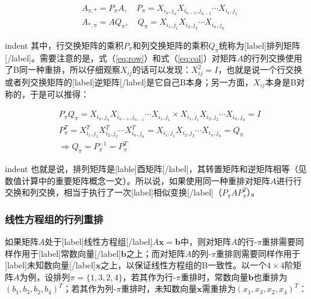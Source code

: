 \documentclass[UTF8,nofonts]{ctexart}
\begin{document}
\begin{eqnarray}
& A_{\pi,\ast} = P_\pi A,\quad P_\pi=X_{i_n,j_n}X_{i_{n-1},j_{n-1}}\cdots X_{i_1,j_1} \label{eq:row}\\
& A_{\ast,\pi} = AQ_\pi,\quad Q_\pi=X_{i_1,j_1}X_{i_2,j_2}\cdots X_{i_n,j_n} \label{eq:col}
\end{eqnarray}

indent 其中，行交换矩阵的乘积$P_\pi$和列交换矩阵的乘积$Q_\pi$统称为[label]排列矩阵[/label]。需要注意的是，式（\ref{eq:row}）和式（\ref{eq:col}）对矩阵$A$的行列交换使用了B同一种重排，所以仔细观察$X_{ij}$的话可以发现：$X^2_{ij}=I$，也就是说一个行交换或者列交换矩阵的[label]逆矩阵[/label]是它自己B本身；另一方面，$X_{ij}$本身是B对称的，于是可以推得：

\begin{eqnarray*}
& P_\pi Q_\pi = X_{i_n,j_n}X_{i_{n-1},j_{n-1}}\cdots X_{i_1,j_1} \times X_{i_1,j_1}X_{i_2,j_2}\cdots X_{i_n,j_n}=I \\
& P^T_{\pi}=X^T_{i_1,j_1}X^T_{i_2,j_2}\cdots X^T_{i_n,j_n}=X_{i_1,j_1}X_{i_2,j_2}\cdots X_{i_n,j_n}=Q_\pi \\
& \Longrightarrow Q_\pi=P^{-1}_\pi=P^T_\pi
\end{eqnarray*}

indent 也就是说，排列矩阵是[lable]酉矩阵[/label]，其转置矩阵和逆矩阵相等（见数值计算中的重要矩阵概念一文）。所以说，如果使用同一种重排对矩阵$A$进行行交换和列交换，相当于执行了一次[label]相似变换[/label]（$P_\pi AP_\pi^T$）。

\subsubsection*{线性方程组的行列重排}

如果矩阵$A$处于[label]线性方程组[/label]$A\boldsymbol{x}=\boldsymbol{b}$中，则对矩阵$A$的行-$\pi$重排需要同样作用于[label]常数向量[/label]$\boldsymbol{b}$之上；而对矩阵$A$的列-$\pi$重排则需要同样作用于[label]未知数向量[/label]$\boldsymbol{x}$之上，以保证线性方程组的B一致性。以一个$4 \times 4$阶矩阵$A$为例，设排列$\pi=\{1,3,2,4\}$，若其作为行-$\pi$重排时，常数向量$\boldsymbol{b}$也重排为$(b_1,b_3,b_2,b_4)^T$；若其作为列-$\pi$重排时，未知数向量$\boldsymbol{x}$需重排为$(x_1,x_3,x_2,x_4)^T$：
\end{document}
